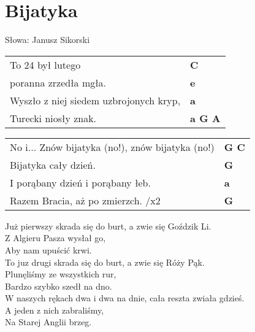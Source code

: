 \section{Bijatyka}

Słowa: Janusz Sikorski

\vspace{2em}
\begin{tabular}{@{}p{7cm}@{}l@{}}
To 24 był lutego & \bfseries C\\
poranna zrzedła mgła. & \bfseries e\\
Wyszło z niej siedem uzbrojonych kryp, & \bfseries a\\
Turecki niosły znak. & \bfseries a G A\\
\end{tabular}

\vspace{1em}
\begin{tabular}{@{}p{7cm}@{}l@{}}
No i... Znów bijatyka (no!), znów bijatyka (no!) & \bfseries G C\\
Bijatyka cały dzień. & \bfseries G\\
I porąbany dzień i porąbany łeb. & \bfseries a\\
Razem Bracia, aż po zmierzch. /x2 & \bfseries G \\
\end{tabular}

\vspace{1em}
Już pierwszy skrada się do burt, a zwie się Goździk Li. \\
Z Algieru Pasza wysłał go, \\
Aby nam upuścić krwi. \\

To juz drugi skrada się do burt, a zwie się Róży Pąk. \\
Plunęliśmy ze wszystkich rur, \\
Bardzo szybko szedł na dno. \\

W naszych rękach dwa i dwa na dnie, cała reszta zwiała gdzieś. \\
A jeden z nich zabraliśmy, \\
Na Starej Anglii brzeg. \\

